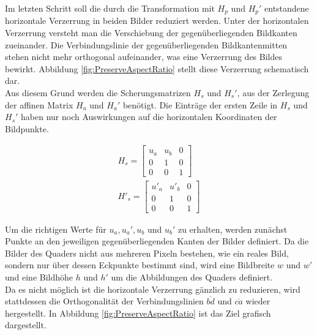 Im letzten Schritt soll die durch die Transformation mit $H_p$ und $H_p'$ entstandene horizontale Verzerrung in beiden Bilder reduziert werden. Unter der horizontalen Verzerrung versteht man die Verschiebung der gegenüberliegenden Bildkanten zueinander. Die Verbindungslinie der gegenüberliegenden Bildkantenmitten stehen nicht mehr orthogonal aufeinander, was eine Verzerrung des Bildes bewirkt. Abbildung \ref{fig:PreserveAspectRatio} stellt diese Verzerrung schematisch dar.\\

Aus diesem Grund werden die Scherungsmatrizen $H_s$ und $H_s'$, aus der Zerlegung der affinen Matrix $H_a$ und $H_a'$ benötigt. Die Einträge der ersten Zeile in $H_s$ und $H_s'$ haben nur noch Auswirkungen auf die horizontalen Koordinaten der Bildpunkte.


\begin{gather}
	H_s =\begin{bmatrix}
		u_a&u_b&0\\
		0&1&0\\
		0&0&1
	\end{bmatrix}\\
	H'_s =\begin{bmatrix}
		u'_a&u'_b&0\\
		0&1&0\\
		0&0&1
	\end{bmatrix}
\end{gather}

Um die richtigen Werte für $u_a, u_a', u_b$ und $u_b'$ zu erhalten, werden zunächst Punkte an den jeweiligen gegenüberliegenden Kanten der Bilder definiert. Da die Bilder des Quaders nicht aus mehreren Pixeln bestehen, wie ein reales Bild, sondern nur über dessen Eckpunkte bestimmt sind, wird eine Bildbreite $w$ und $w'$ und eine Bildhöhe $h$ und $h'$ um die Abbildungen des Quaders definiert. \\

Da es nicht möglich ist die horizontale Verzerrung gänzlich zu reduzieren, wird stattdessen die Orthogonalität der Verbindungslinien $\overline{bd}$ und $\overline{ca}$ wieder hergestellt. In Abbildung \ref{fig:PreserveAspectRatio} ist das Ziel grafisch dargestellt.\\


